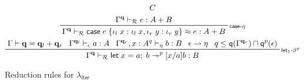 \documentclass[acmsmall,screen,review]{acmart}
\newcommand{\mc}[1]{\ensuremath{\mathcal{#1}}}
\newcommand{\mb}[1]{\ensuremath{\mathbf{#1}}}
\newcommand{\ms}[1]{\ensuremath{\mathsf{#1}}}
\newcommand{\lto}{:}
\newcommand{\linl}[1]{\iota_l\;{#1}}
\newcommand{\linr}[1]{\iota_r\;{#1}}
\newcommand{\letexpr}[3]{\ensuremath{\ms{let}\;#1 = #2;\;#3}}
\newcommand{\caseexpr}[5]{\ms{case}\;#1\;\{\linl{#2} \lto #3, \linr{#4} \lto #5\}}
\newcommand{\qsp}[4]{#1 \vdash #2 = #3 + #4}
\newcommand{\rle}[1]{{\scriptsize\textsf{#1}}}
\newcommand{\hasty}[4]{#1 \vdash_{#2} #3: {#4}}
\newcommand{\teqv}{\approx}
\newcommand{\tref}{\twoheadrightarrow}
\newcommand{\tmlep}[6]{#1 \vdash_{#2} #3 \tref^{#6} #4 : {#5}}
\newcommand{\tmeq}[5]{#1 \vdash_{#2} #3 \teqv #4 : {#5}}
\newcommand{\subiterexp}{\texorpdfstring{\(\lambda_{\ms{iter}}\)}{lambda-iter}}
\newcommand{\rightmove}{\rightharpoonup}
\newcommand{\alquant}{\ms{q}}
\begin{document}
\begin{figure}
\begin{adjustbox}{minipage=1.1\textwidth,scale=0.9}
\begin{gather*}
{        {C}
      } \\
    \prftree[r]{\rle{case-$\eta$}}
      {\hasty{\Gamma^{\mb{q}}}{\mc{R}}{e}{A + B}}
      {\tmeq{\Gamma^{\mb{q}}}{\mc{R}}
        {\caseexpr{e}{x}{\linl{x}}{y}{\linr{y}}}
        {e}
        {A + B}
      } \\
    \prftree[r]{\rle{let$_1$-$\beta^p$}}
      {\qsp{\Gamma}{\mb{q}}{\mb{q}_l}{\mb{q}_r}}
      {\hasty{\Gamma^{\mb{q}_l}}{\epsilon}{a}{A}}
      {\hasty{\Gamma^{\mb{q}_r}, x : A^q}{\eta}{b}{B}}
      {\epsilon \rightmove \eta}
      {q \leq \alquant(\Gamma^{\mb{q}_r}) \sqcap \alquant^p(\epsilon)}
      {
        \tmlep{\Gamma^{\mb{q}}}{\mc{R}}{\letexpr{x}{a}{b}}{[x/a]b}{B}{p}
      }
  \end{gather*}
  \end{adjustbox}
  \caption{Reduction rules for \subiterexp{}}
  \Description{}
  \label{fig:reduction-rules}
\end{figure}
\end{document}
